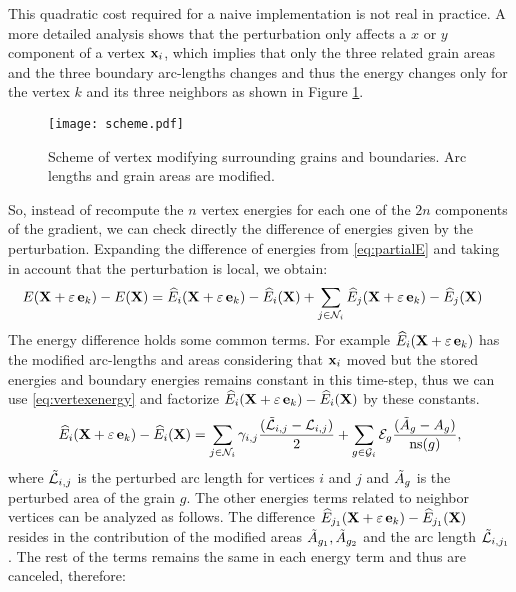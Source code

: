 This quadratic cost required for a naive implementation is not real in practice. 
A more detailed analysis shows that the perturbation only affects a $x$ or $y$ component of a vertex $\x_i$, which implies that only the three related grain areas and the three boundary arc-lengths changes and thus the energy changes only for the  vertex $k$ and its three neighbors as shown in Figure \ref{fig:delta_energy}.
\begin{figure}[t]
    \centering
    \texttt{[image: scheme.pdf]}
    \caption[Vertex perturbation in Stored Energy model]{Scheme of vertex modifying surrounding grains and boundaries. Arc lengths and grain areas are modified.}
    \label{fig:delta_energy}
\end{figure}

So, instead of recompute the $n$ vertex energies for each one of the $2n$ components of the gradient, we can check directly the difference of energies given by the perturbation. 
Expanding the difference of energies from \eqref{eq:partialE} and taking in account that the perturbation is local, we obtain:
\begin{align}
    E(\X+\varepsilon\,  \ei{k}) - E(\X) &=  \widehat{E}_i(\X+\varepsilon\,  \ei{k}) - \widehat{E}_i(\X) + \sum_{j \in \mathcal{N}_i}  \widehat{E}_{j}(\X+\varepsilon\,  \ei{k}) - \widehat{E}_{j}(\X)
\end{align}
The energy difference holds some common terms. For example $\widehat{E}_i(\X+\varepsilon\,  \ei{k})$ has the modified arc-lengths and areas considering that $\x_i$ moved but the stored energies and boundary energies remains constant in this time-step, thus we can use \eqref{eq:vertexenergy} and factorize $\widehat{E}_i(\X+\varepsilon\,  \ei{k}) - \widehat{E}_i(\X)$ by these constants.
\begin{equation*}
     \widehat{E}_i(\X+\varepsilon\,  \ei{k}) -  \widehat{E}_i(\X)=  \sum_{j \in \mathcal{N}_i}  \gamma_{i, j} \frac{(\Tilde{\AL}_{i,j} - \AL_{i,j})}{2} + \sum_{g \in \mathcal{G}_i} \SE_{g}\frac{(\Tilde{A}_{g} - A_{g})}{\ns(g)} ,
\end{equation*}
where $\Tilde{\mathcal{L}}_{i,j}$ is the perturbed arc length for vertices $i$ and $j$ and $\Tilde{A}_{g}$ is the perturbed area of the grain $g$. The other energies terms related to neighbor vertices can be analyzed as follows. The difference $\widehat{E}_{j_1}(\X+\varepsilon\,  \ei{k}) - \widehat{E}_{j_1}(\X)$ resides in the contribution of the modified areas $\Tilde{A}_{g_1}, \Tilde{A}_{g_2}$ and the arc length $\Tilde{\mathcal{L}}_{i, j_1}$. The rest of the terms remains the same in each energy term and thus are canceled, therefore:

